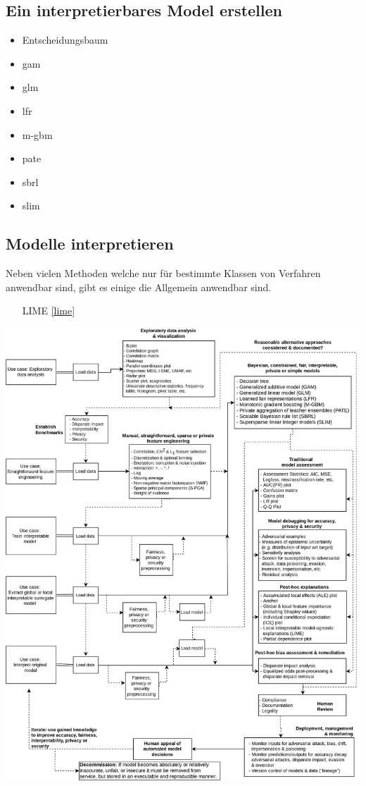 \documentclass[
  12pt, %
  a4paper, %
  oneside, %
  openany, 
  numbers=noenddot, %
  BCOR=5mm, %
  parskip=half*, %
  thesis, %
]{bfhbook}
\begin{document}
\subsection{Ein interpretierbares Model erstellen}
\begin{itemize}
	\item Entscheidungsbaum
	\item \acrfull{gam}
	\item \acrfull{glm}
	\item \acrfull{lfr}
	\item \acrfull{m-gbm}
	\item \acrfull{pate}	
	\item \acrfull{sbrl}
	\item \acrfull{slim}
\end{itemize}
\subsection{Modelle interpretieren}
Neben vielen Methoden welche nur für bestimmte Klassen von Verfahren anwendbar sind, gibt es einige die Allgemein anwendbar sind.

\begin{itemize}
	\item[LIME] \ref{lime}
\end{itemize}

\includegraphics[width=\textwidth]{Bilder/blueprint.png}
\end{document}
